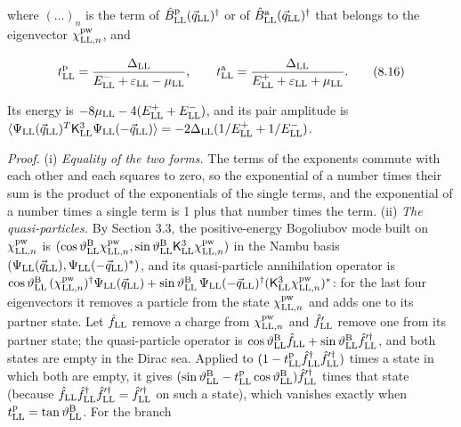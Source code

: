 \documentclass[
  10pt,
]{article}
\begin{document}
where \((\ldots)_n\) is the term of
\(\hat B^{\rm p}_{\rm LL}(\vec q_{\rm LL})^\dagger\) or of
\(\hat B^{\rm a}_{\rm LL}(\vec q_{\rm LL})^\dagger\) that belongs to the
eigenvector \(\chi^{\rm pw}_{{\rm LL},n}\), and

\[t^{\rm p}_{\rm LL}=\frac{\Delta_{\rm LL}}{E^-_{\rm LL}+\varepsilon_{\rm LL}-\mu_{\rm LL}},\qquad t^{\rm a}_{\rm LL}=\frac{\Delta_{\rm LL}}{E^+_{\rm LL}+\varepsilon_{\rm LL}+\mu_{\rm LL}}.\tag{8.16}\]

Its energy is \(-8\mu_{\rm LL}-4(E^+_{\rm LL}+E^-_{\rm LL})\), and its
pair amplitude is
\(\langle\Psi_{\rm LL}(\vec q_{\rm LL})^T\mathsf K^3_{\rm LL}\Psi_{\rm LL}(-\vec q_{\rm LL})\rangle=-2\Delta_{\rm LL}(1/E^+_{\rm LL}+1/E^-_{\rm LL})\).

\emph{Proof.} (i) \emph{Equality of the two forms.} The terms of the
exponents commute with each other and each squares to zero, so the
exponential of a number times their sum is the product of the
exponentials of the single terms, and the exponential of a number times
a single term is 1 plus that number times the term. (ii) \emph{The
quasi-particles.} By Section 3.3, the positive-energy Bogoliubov mode
built on \(\chi^{\rm pw}_{{\rm LL},n}\) is
\((\cos\vartheta^{\rm B}_{\rm LL}\chi^{\rm pw}_{{\rm LL},n},\sin\vartheta^{\rm B}_{\rm LL}\mathsf K^3_{\rm LL}\chi^{\rm pw}_{{\rm LL},n})\)
in the Nambu basis
\((\Psi_{\rm LL}(\vec q_{\rm LL}),\Psi_{\rm LL}(-\vec q_{\rm LL})^*)\),
and its quasi-particle annihilation operator is
\(\cos\vartheta^{\rm B}_{\rm LL}\,(\chi^{\rm pw}_{{\rm LL},n})^\dagger\Psi_{\rm LL}(\vec q_{\rm LL})+\sin\vartheta^{\rm B}_{\rm LL}\,\Psi_{\rm LL}(-\vec q_{\rm LL})^\dagger(\mathsf K^3_{\rm LL}\chi^{\rm pw}_{{\rm LL},n})^*\):
for the last four eigenvectors it removes a particle from the state
\(\chi^{\rm pw}_{{\rm LL},n}\) and adds one to its partner state. Let
\(\hat f_{\rm LL}\) remove a charge from \(\chi^{\rm pw}_{{\rm LL},n}\)
and \(\hat f'_{\rm LL}\) remove one from its partner state; the
quasi-particle operator is
\(\cos\vartheta^{\rm B}_{\rm LL}\hat f_{\rm LL}+\sin\vartheta^{\rm B}_{\rm LL}\hat f'^\dagger_{\rm LL}\),
and both states are empty in the Dirac sea. Applied to
\((1-t^{\rm p}_{\rm LL}\hat f^\dagger_{\rm LL}\hat f'^\dagger_{\rm LL})\)
times a state in which both are empty, it gives
\((\sin\vartheta^{\rm B}_{\rm LL}-t^{\rm p}_{\rm LL}\cos\vartheta^{\rm B}_{\rm LL})\hat f'^\dagger_{\rm LL}\)
times that state (because
\(\hat f_{\rm LL}\hat f^\dagger_{\rm LL}\hat f'^\dagger_{\rm LL}=\hat f'^\dagger_{\rm LL}\)
on such a state), which vanishes exactly when
\(t^{\rm p}_{\rm LL}=\tan\vartheta^{\rm B}_{\rm LL}\). For the branch
\end{document}
